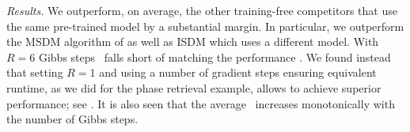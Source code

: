 \emph{Results.} We outperform, on average, the other training-free competitors that use the same pre-trained model by a substantial margin. In particular, we outperform the MSDM algorithm of \citet{mariani2023multi} as well as ISDM which uses a different model. With $R = 6$ Gibbs steps \algo\ falls short of matching the performance \demucs. We found instead that setting $R = 1$ and using a number of gradient steps ensuring equivalent runtime, as we did for the phase retrieval example, allows to achieve superior performance; see . It is also seen that the average \sisdri\ increases monotonically with the number of Gibbs steps. 
 
\begin{table}[t]
    \centering
    \captionsetup{font=small}
    \caption{Mean \sisdri\ on \slakh\ test dataset. The last row displays the mean over the four stems. Higher metrics are better.}
    \label{table:si-snri}
\end{table}
